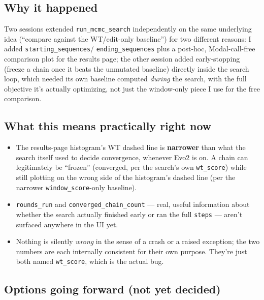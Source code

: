 \documentclass[11pt]{article}
\begin{document}
\subsection*{Why it happened}

Two sessions extended \texttt{run\_mcmc\_search} independently on the same
underlying idea (``compare against the WT/edit-only baseline'') for two
different reasons: I added \texttt{starting\_sequences}/
\texttt{ending\_sequences} plus a post-hoc, Modal-call-free comparison plot
for the results page; the other session added early-stopping (freeze a chain
once it beats the unmutated baseline) directly inside the search loop, which
needed its own baseline computed \emph{during} the search, with the full
objective it's actually optimizing, not just the window-only piece I use for
the free comparison.

\subsection*{What this means practically right now}

\begin{itemize}
  \item The results-page histogram's WT dashed line is \textbf{narrower}
    than what the search itself used to decide convergence, whenever Evo2 is
    on. A chain can legitimately be ``frozen'' (converged, per the search's
    own \texttt{wt\_score}) while still plotting on the wrong side of the
    histogram's dashed line (per the narrower \texttt{window\_score}-only
    baseline).
  \item \texttt{rounds\_run} and \texttt{converged\_chain\_count} --- real,
    useful information about whether the search actually finished early or
    ran the full \texttt{steps} --- aren't surfaced anywhere in the UI yet.
  \item Nothing is silently \emph{wrong} in the sense of a crash or a raised
    exception; the two numbers are each internally consistent for their own
    purpose. They're just both named \texttt{wt\_score}, which is the actual
    bug.
\end{itemize}

\subsection*{Options going forward (not yet decided)}
\end{document}
